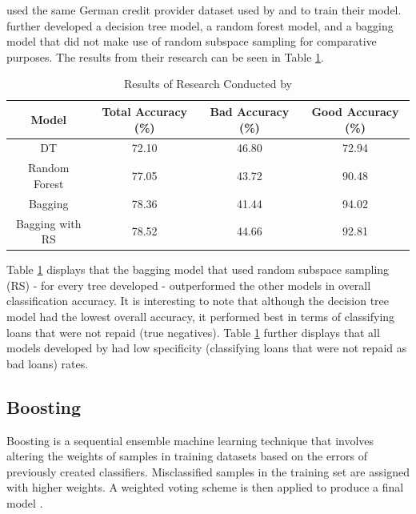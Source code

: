 \textcite{BagWang} used the same German credit provider dataset used by \textcite{NNWest} and \textcite{NNShen} to train their model. \textcite{BagWang} further developed a decision tree model, a random forest model, and a bagging model that did not make use of random subspace sampling for comparative purposes. The results from their research can be seen in Table \ref{table:bagging}. 


\vspace{10pt}

\begin{table}[H]
\begin{center}
\begin{tabular}{|c|c|c|c|} 
\hline
\multicolumn{1}{|c}{Model}  &\multicolumn{1}{|c|}{Total Accuracy (\%)}  &\multicolumn{1}{|c|}{Bad Accuracy (\%)} & \multicolumn{1}{c|}{Good Accuracy (\%)}\\
\hline
DT  & 72.10 &  46.80 & 72.94 \\
\hline
Random Forest & 77.05 & 43.72 & 90.48 \\
\hline
Bagging & 78.36 & 41.44 & 94.02 \\
\hline
Bagging with RS & 78.52 &  44.66 & 92.81 \\
\hline
\end{tabular}
\end{center}
\caption{Results of Research Conducted by \textcite{BagWang}}
\label{table:bagging}
\end{table}

\vspace{10pt}

Table \ref{table:bagging} displays that the bagging model that used random subspace sampling (RS) - for every tree developed - outperformed the other models in overall classification accuracy. It is interesting to note that although the decision tree model had the lowest overall accuracy, it performed best in terms of classifying loans that were not repaid (true negatives). Table \ref{table:bagging} further displays that all models developed by \textcite{BagWang} had low specificity (classifying loans that were not repaid as bad loans) rates. 


\subsection{Boosting}

Boosting is a sequential ensemble machine learning technique that involves altering the weights of samples in training datasets based on the errors of previously created classifiers. Misclassified samples in the training set are assigned with higher weights. A weighted voting scheme is then applied to produce a final model \parencite{BoostingFreund}. \\

